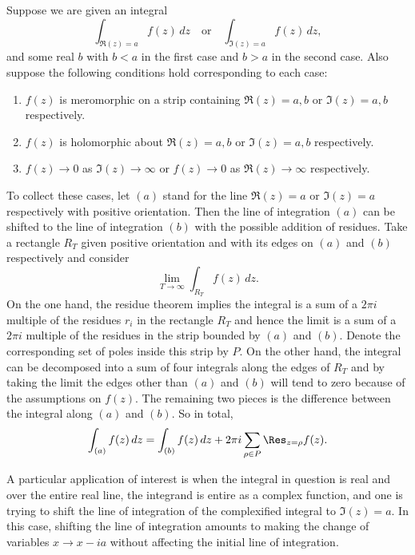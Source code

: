         \begin{method}
          Suppose we are given an integral
          \[
            \int_{\Re(z) = a}f(z)\,dz \quad \text{or} \quad \int_{\Im(z) = a}f(z)\,dz,
          \]
          and some real $b$ with $b < a$ in the first case and $b > a$ in the second case. Also suppose the following conditions hold corresponding to each case:
          \begin{enumerate}[label=(\roman*)]
            \item $f(z)$ is meromorphic on a strip containing $\Re(z) = a,b$ or $\Im(z) = a,b$ respectively.
            \item $f(z)$ is holomorphic about $\Re(z) = a,b$ or $\Im(z) = a,b$ respectively.
            \item $f(z) \to 0$ as $\Im(z) \to \infty$ or $f(z) \to 0$ as $\Re(z) \to \infty$ respectively.
          \end{enumerate}
          To collect these cases, let $(a)$ stand for the line $\Re(z) = a$ or $\Im(z) = a$ respectively with positive orientation. Then the line of integration $(a)$ can be shifted to the line of integration $(b)$ with the possible addition of residues. Take a rectangle $R_{T}$ given positive orientation and with its edges on $(a)$ and $(b)$ respectively and consider
          \[
            \lim_{T \to \infty}\int_{R_{T}}f(z)\,dz.
          \]
          On the one hand, the residue theorem implies the integral is a sum of a $2\pi i$ multiple of the residues $r_{i}$ in the rectangle $R_{T}$ and hence the limit is a sum of a $2\pi i$ multiple of the residues in the strip bounded by $(a)$ and $(b)$. Denote the corresponding set of poles inside this strip by $P$. On the other hand, the integral can be decomposed into a sum of four integrals along the edges of $R_{T}$ and by taking the limit the edges other than $(a)$ and $(b)$ will tend to zero because of the assumptions on $f(z)$. The remaining two pieces is the difference between the integral along $(a)$ and $(b)$. So in total,
          \[
            \int_{(a)}f(z)\,dz = \int_{(b)}f(z)\,dz+2\pi i\sum_{\rho \in P}\Res_{z = \rho}f(z).
          \]
        \end{method}

        A particular application of interest is when the integral in question is real and over the entire real line, the integrand is entire as a complex function, and one is trying to shift the line of integration of the complexified integral to $\Im(z) = a$. In this case, shifting the line of integration amounts to making the change of variables $x \to x-ia$ without affecting the initial line of integration.
